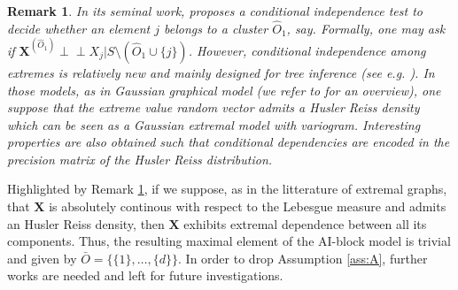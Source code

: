 \documentclass[11pt]{article}
\newtheorem{remark}{Remark}
\newcommand{\indep}{\perp \!\!\! \perp}
\begin{document}
	\begin{remark}
		\label{rem:tree_model}
		In its seminal work, \cite{NIPS2017_37d097ca} proposes a conditional independence test to decide whether an element $j$ belongs to a cluster $\hat{O}_1$, say. Formally, one may ask if $\textbf{X}^{(\hat{O}_1)} \indep X_j | S \setminus (\hat{O}_1 \cup \{j\})$. However, conditional independence among extremes is relatively new and mainly designed for tree inference (see \emph{e.g.} \cite{engelke2020graphical, asenova2021inference, segers2020one, engelke2020structure}). In those models, as in Gaussian graphical model (we refer to \cite{lauritzen1996graphical} for an overview), one suppose that the extreme value random vector admits a Husler Reiss density which can be seen as a Gaussian extremal model with variogram. Interesting properties are also obtained such that conditional dependencies are encoded in the precision matrix of the Husler Reiss distribution.
	\end{remark}
	Highlighted by Remark \ref{rem:tree_model}, if we suppose, as in the litterature of extremal graphs, that $\textbf{X}$ is absolutely continous with respect to the Lebesgue measure and admits an Husler Reiss density, then $\textbf{X}$ exhibits extremal dependence between all its components. Thus, the resulting maximal element of the AI-block model is trivial and given by $\bar{O} = \{ \{1\}, \dots, \{d\}\}$. In order to drop Assumption \ref{ass:A}, further works are needed and left for future investigations.
	
\end{document}
